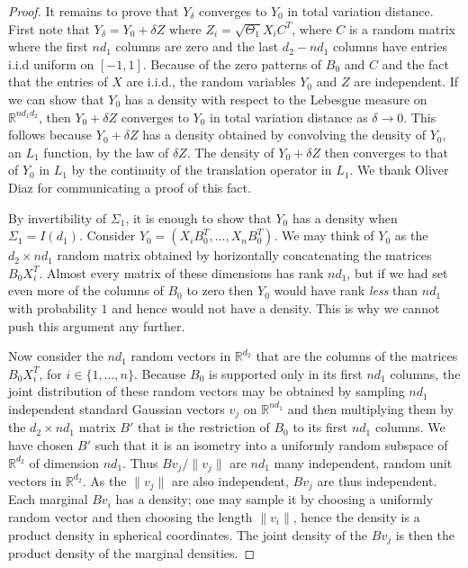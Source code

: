 \documentclass[aos]{imsart}
\theoremstyle{definition}
\numberwithin{equation}{section}
\newcommand{\R}{{\mathbb{R}}}
\begin{document}
\begin{proof}
It remains to prove that $Y_\delta$ converges to $Y_0$ in total variation distance. First note that $Y_\delta = Y_0 + \delta Z$ where $Z_i = \sqrt{\Theta_1} X_i C^T$, where $C$ is a random matrix where the first $nd_1$ columns are zero and the last $d_2 - n d_1$ columns have entries i.i.d uniform on $[-1, 1]$. 
Because of the zero patterns of $B_0$ and $C$ and the fact that the entries of $X$ are i.i.d., the random variables $Y_0$ and $Z$ are independent. 
If we can show that $Y_0$ has a density with respect to the Lebesgue measure on $\R^{nd_1d_2}$, then $Y_0 + \delta Z$ converges to $Y_0$ in total variation distance as $\delta \to 0$. This follows because $Y_0 + \delta Z$ has a density obtained by convolving the density of $Y_0$, an $L_1$ function, by the law of $\delta Z$. The density of $Y_0 + \delta Z$ then converges to that of $Y_0$ in $L_1$ by the continuity of the translation operator in $L_1$. We thank Oliver Diaz for communicating a proof of this fact.


By invertibility of $\Sigma_1$, it is enough to show that $Y_0$ has a density when $\Sigma_1 = I(d_1)$. Consider $Y_0 = (X_i B_0^T, \dots, X_n B_0^T)$. We may think of $Y_0$ as the $d_2 \times n d_1$ random matrix obtained by horizontally concatenating the matrices $B_0X_i^T$. Almost every matrix of these dimensions has rank $n d_1$, but if we had set even more of the columns of $B_0$ to zero then $Y_0$ would have rank \emph{less} than $ n d_1$ with probability $1$ and hence would not have a density. This is why we cannot push this argument any further. 

Now consider the $nd_1$ random vectors in $ \R^{d_2}$ that are the columns of the matrices $B_0X_i^T$, for $i \in \{1, \dots, n\}$. 
Because $B_0$ is supported only in its first $nd_1$ columns, the joint distribution of these random vectors may be obtained by sampling $n d_1$ independent standard Gaussian vectors $v_j$ on $\R^{nd_1}$ and then multiplying them by the $d_2 \times nd_1$ matrix $B'$ that is the restriction of $B_0$ to its first $nd_1$ columns. 
We have chosen $B'$ such that it is an isometry into a uniformly random subspace of $\R^{d_2}$ of dimension $nd_1$. Thus $Bv_j/\|v_j\|$ are $nd_1$ many independent, random unit vectors in $\R^{d_2}$. As the $\|v_j\|$ are also independent, $B v_j$ are thus independent. Each marginal $Bv_i$ has a density; one may sample it by choosing a uniformly random vector and then choosing the length $\|v_i\|$, hence the density is a product density in spherical coordinates. The joint density of the $Bv_j$ is then the product density of the marginal densities.
\end{proof}
\end{document}
